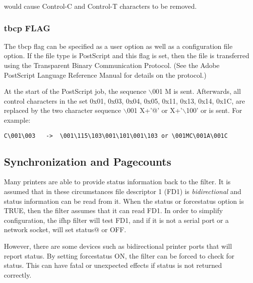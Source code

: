 \documentclass[a4paper]{article}
\begin{document}
would cause Control-C and Control-T characters to be removed.


\subsubsection{tbcp FLAG
\label{tbcp}}

The
{\ttfamily tbcp}
flag can be specified as a user option as well as a
configuration file option.
If the file type is PostScript and this flag is set,
then the file is transferred using the Transparent Binary Communication
Protocol.
(See the Adobe PostScript Language Reference Manual for details on
the protocol.)

At the start of the PostScript job,
the sequence {\ttfamily $\backslash$001} {\ttfamily M} is sent.
Afterwards,  all control characters in the set
{\ttfamily 0x01, 0x03, 0x04, 0x05,
0x11, 0x13, 0x14, 0x1C,}
are replaced by the two character sequence {\ttfamily $\backslash$001}
{\ttfamily X+'@'} or
{\ttfamily X+'$\backslash$100'} or
is sent.
For example:
\begin{tscreen}
\begin{verbatim}
C\001\003   ->  \001\115\103\001\101\001\103 or \001MC\001A\001C
\end{verbatim}
\end{tscreen}





\subsection{Synchronization and Pagecounts
\label{syncpage}
\label{pagecount}
\label{pagecount_interval}
\label{pagecount_timeout}
\label{pagecount_ps_code}
\label{sync}
\label{sync_interval}
\label{sync_timeout}}

Many printers are able to provide status information back to the
filter.
It is assumed that in these circumstances file descriptor 1
(FD1)
is
{\itshape bidirectional\/}
and status information can be read from it.
When the
{\ttfamily status}
or
{\ttfamily forcestatus}
option is TRUE,
then the filter assumes that it can read FD1.
In order to simplify configuration,
the
{\ttfamily ifhp}
filter will test FD1, and if it is not
a serial port or a network socket, will set
{\ttfamily status@}
or OFF.

However, there are some devices such as bidirectional printer ports
that will report status.
By setting
{\ttfamily forcestatus}
ON,
the filter can be forced to check for status.
This can have fatal or unexpected effects if status is not returned
correctly.
\end{document}
